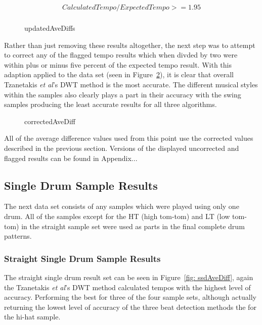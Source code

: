 \documentclass[a4paper, 11pt]{article}
\begin{document}
\begin{equation}\label{eq: flag}
\begin{split}
Calculated Tempo/Expected Tempo >= 1.95\\
\end{split}
\end{equation}

\begin{figure}
\caption{updatedAveDiffs}
\label{fig: upAveDiff}
\end{figure}

Rather than just removing these results altogether, the next step was to attempt to correct any of the flagged tempo results which when divded by two were within plus or minus five percent of the expected tempo result. With this adaption applied to the data set (seen in Figure~\ref{fig: corAveDiff}), it is clear that overall Tzanetakis \textit{et al}'s \cite{tzane1} DWT method is the most accurate. The different musical styles within the samples also clearly plays a part in their accuracy with the swing samples producing the least accurate results for all three algorithms.


\begin{figure}
\caption{correctedAveDiff}
\label{fig: corAveDiff}
\end{figure}

All of the average difference values used from this point use the corrected values described in the previous section. Versions of the displayed uncorrected and flagged results can be found in Appendix...

\subsection{Single Drum Sample Results}
The next data set consists of any samples which were played using only one drum. All of the samples except for the HT (high tom-tom) and LT (low tom-tom) in the straight sample set were used as parts in the final complete drum patterns.\par

\subsubsection{Straight Single Drum Sample Results}

The straight single drum result set can be seen in Figure~\ref{fig: ssdAveDiff}, again the Tzanetakis \textit{et al}'s \cite{tzane1} DWT method calculated tempos with the highest level of accuracy. Performing the best for three of the four sample sets, although actually returning the lowest level of accuracy of the three beat detection methods the for the hi-hat sample.\par
\end{document}
